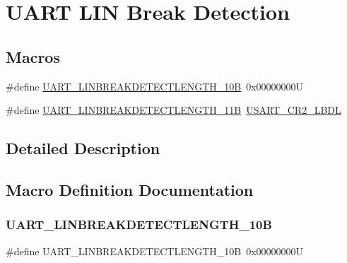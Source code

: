 \hypertarget{group___u_a_r_t___l_i_n___break___detection}{}\section{U\+A\+RT L\+IN Break Detection}
\label{group___u_a_r_t___l_i_n___break___detection}
\subsection*{Macros}
\begin{DoxyCompactItemize}
\item 
\#define \mbox{\hyperlink{group___u_a_r_t___l_i_n___break___detection_ga027616b7a36b36e0e51ffee947533624}{U\+A\+R\+T\+\_\+\+L\+I\+N\+B\+R\+E\+A\+K\+D\+E\+T\+E\+C\+T\+L\+E\+N\+G\+T\+H\+\_\+10B}}~0x00000000U
\item 
\#define \mbox{\hyperlink{group___u_a_r_t___l_i_n___break___detection_ga2f66fcd37de7a3ca9e1101305f2e23e6}{U\+A\+R\+T\+\_\+\+L\+I\+N\+B\+R\+E\+A\+K\+D\+E\+T\+E\+C\+T\+L\+E\+N\+G\+T\+H\+\_\+11B}}~\mbox{\hyperlink{group___peripheral___registers___bits___definition_ga7f9bc41700717fd93548e0e95b6072ed}{U\+S\+A\+R\+T\+\_\+\+C\+R2\+\_\+\+L\+B\+DL}}
\end{DoxyCompactItemize}


\subsection{Detailed Description}


\subsection{Macro Definition Documentation}
\mbox{\label{group___u_a_r_t___l_i_n___break___detection_ga027616b7a36b36e0e51ffee947533624}} 
\subsubsection{\texorpdfstring{UART\_LINBREAKDETECTLENGTH\_10B}{UART\_LINBREAKDETECTLENGTH\_10B}}
{\footnotesize\ttfamily \#define U\+A\+R\+T\+\_\+\+L\+I\+N\+B\+R\+E\+A\+K\+D\+E\+T\+E\+C\+T\+L\+E\+N\+G\+T\+H\+\_\+10B~0x00000000U}

